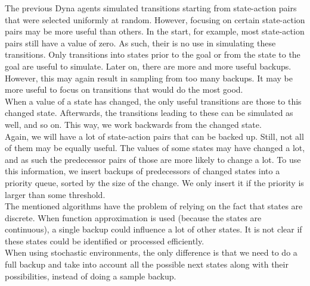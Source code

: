 \documentclass[a4paper]{article}
\begin{document}
The previous Dyna agents simulated transitions starting from state-action pairs that were selected uniformly at random. However, focusing on certain state-action pairs may be more useful than others. In the start, for example, most state-action pairs still have a value of zero. As such, their is no use in simulating these transitions. Only transitions into states prior to the goal or from the state to the goal are useful to simulate. Later on, there are more and more useful backups. However, this may again result in sampling from too many backups. It may be more useful to focus on transitions that would do the most good.\\
When a value of a state has changed, the only useful transitions are those to this changed state. Afterwards, the transitions leading to these can be simulated as well, and so on. This way, we work backwards from the changed state.\\
Again, we will have a lot of state-action pairs that can be backed up. Still, not all of them may be equally useful. The values of some states may have changed a lot, and as such the predecessor pairs of those are more likely to change a lot. To use this information, we insert backups of predecessors of changed states into a priority queue, sorted by the size of the change. We only insert it if the priority is larger than some threshold.\\
The mentioned algorithms have the problem of relying on the fact that states are discrete. When function approximation is used (because the states are continuous), a single backup could influence a lot of other states. It is not clear if these states could be identified or processed efficiently.\\
When using stochastic environments, the only difference is that we need to do a full backup and take into account all the possible next states along with their possibilities, instead of doing a sample backup.\\
\end{document}
